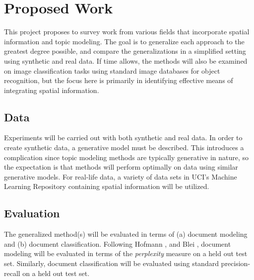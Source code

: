 \documentclass[twocolumn]{article}
\begin{document}
\section{Proposed Work}

This project proposes to survey work from various fields that incorporate spatial information and topic modeling.  The goal is to generalize each approach to the greatest degree possible, and compare the generalizations in a simplified setting using synthetic and real data.  If time allows, the methods will also be examined on image classification tasks using standard image databases for object recognition, but the focus here is primarily in identifying effective means of integrating spatial information.  

\subsection{Data}
Experiments will be carried out with both synthetic and real data.  In order to create synthetic data, a generative model must be described.  This introduces a complication since topic modeling methods are typically generative in nature, so the expectation is that methods will perform optimally on data using similar generative models.  For real-life data, a variety of data sets in UCI's Machine Learning Repository\cite{uci2007} containing spatial information will be utilized.

\subsection{Evaluation}
The generalized method(s) will be evaluated in terms of (a) document modeling and (b) document classification.  Following Hofmann \cite{hofmann99probabilistic}, and Blei \cite{blei02latent}, document modeling will be evaluated in terms of the \textit{perplexity} measure on a held out test set.  Similarly, document classification will be evaluated using standard precision-recall on a held out test set. 


\end{document}
